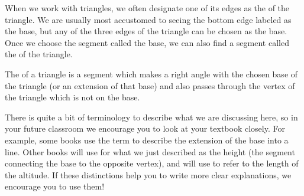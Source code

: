 \documentclass{ximera}
\begin{document}
When we work with triangles, we often designate one of its edges as the  of the triangle. We are usually most accustomed to seeing the bottom edge labeled as the base, but any of the three edges of the triangle can be chosen as the base. Once we choose the segment called the base, we can also find a segment called the  of the triangle.
\begin{definition}
The  of a triangle is a segment which makes a right angle with the chosen base of the triangle (or an extension of that base) and also passes through the vertex of the triangle which is not on the base.
\end{definition}

There is quite a bit of terminology to describe what we are discussing here, so in your future classroom we encourage you to look at your textbook closely. For example, some books use the term  to describe the extension of the base into a line. Other books will use  for what we just described as the height (the segment connecting the base to the opposite vertex), and will use  to refer to the length of the altitude. If these distinctions help you to write more clear explanations, we encourage you to use them!
\end{document}
